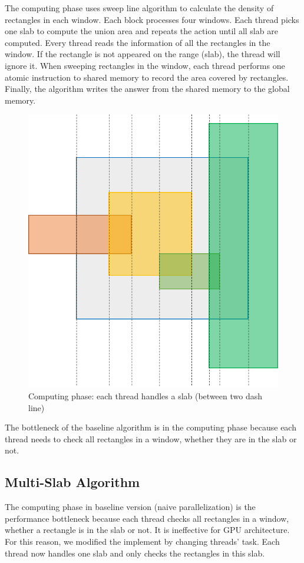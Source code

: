 The computing phase uses sweep line algorithm to calculate the density of rectangles in each window. Each block processes four windows.  Each thread picks one slab to compute the union area and repeats the action until all slab are computed. Every thread reads the information of all the rectangles in the window. If the rectangle is not appeared on the range (slab), the thread will ignore it. When sweeping rectangles in the window, each thread performs one atomic instruction to shared memory to record the area covered by rectangles. Finally, the algorithm writes the answer from the shared memory to the global memory.
\begin{figure}[h]
    \centering
    \includegraphics[scale=0.4]{image/fig_3_4}
    \caption{Computing phase: each thread handles a slab (between two dash line)}
    \label{fig:fig_3_4}
\end{figure}


The bottleneck of the baseline algorithm is in the computing phase because each thread needs to check all rectangles in a window, whether they are in the slab or not.  

\subsection{Multi-Slab Algorithm}
The computing phase in baseline version (naive parallelization) is the performance bottleneck because each thread checks all rectangles in a window, whether a rectangle is in the slab or not. It is ineffective for GPU architecture. For this reason, we modified the implement by changing threads' task. Each thread now handles one slab and only checks the rectangles in this slab.

